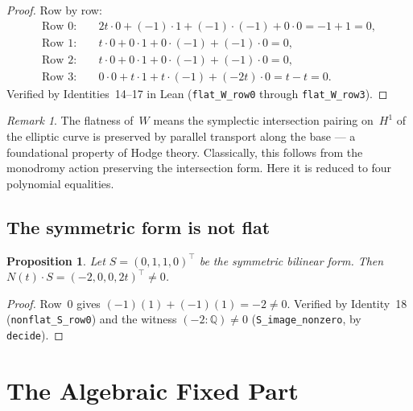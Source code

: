 \documentclass[11pt]{article}
\theoremstyle{plain}
\newtheorem{proposition}[theorem]{Proposition}
\theoremstyle{definition}
\theoremstyle{remark}
\newtheorem{remark}[theorem]{Remark}
\newcommand{\Q}{\mathbb{Q}}
\begin{document}
\begin{proof}
Row by row:
\begin{align*}
\text{Row } 0\!: \quad & 2t \cdot 0 + (-1) \cdot 1
  + (-1) \cdot (-1) + 0 \cdot 0 = -1 + 1 = 0, \\
\text{Row } 1\!: \quad & t \cdot 0 + 0 \cdot 1
  + 0 \cdot (-1) + (-1) \cdot 0 = 0, \\
\text{Row } 2\!: \quad & t \cdot 0 + 0 \cdot 1
  + 0 \cdot (-1) + (-1) \cdot 0 = 0, \\
\text{Row } 3\!: \quad & 0 \cdot 0 + t \cdot 1
  + t \cdot (-1) + (-2t) \cdot 0 = t - t = 0.
\end{align*}
Verified by Identities~14--17 in Lean
(\texttt{flat\_W\_row0} through \texttt{flat\_W\_row3}).
\end{proof}

\begin{remark}\label{rem:physical}
The flatness of~$W$ means the symplectic intersection
pairing on~$H^1$ of the elliptic curve is preserved by
parallel transport along the base --- a foundational
property of Hodge theory.  Classically, this follows from
the monodromy action preserving the intersection form.
Here it is reduced to four polynomial equalities.
\end{remark}

\subsection{The symmetric form is not flat}

\begin{proposition}\label{prop:nonflat-S}
Let $S = (0, 1, 1, 0)^{\!\top}$ be the symmetric bilinear
form.  Then $N(t) \cdot S = (-2, 0, 0, 2t)^{\!\top} \neq 0$.
\end{proposition}

\begin{proof}
Row~0 gives $(-1)(1) + (-1)(1) = -2 \neq 0$.
Verified by Identity~18 (\texttt{nonflat\_S\_row0}) and
the witness $(-2 : \Q) \neq 0$ (\texttt{S\_image\_nonzero},
by \texttt{decide}).
\end{proof}

\section{The Algebraic Fixed Part}\label{sec:fixed}
\end{document}
